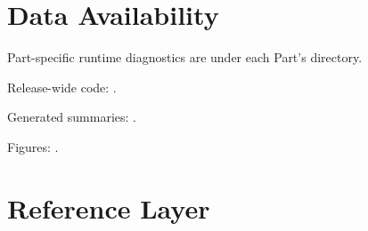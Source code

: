 \documentclass[11pt,a4paper]{article}
\begin{document}
\section*{Data Availability}
Part-specific runtime diagnostics are under each Part's  directory.

Release-wide code: .

Generated summaries: .

Figures: .


\section{Reference Layer}


\end{document}
